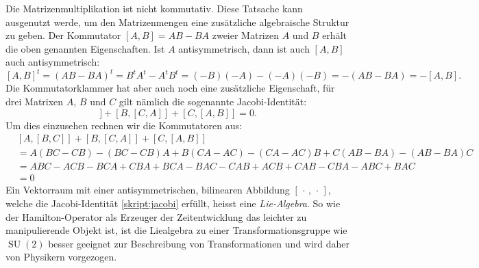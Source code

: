 Die Matrizenmultiplikation ist nicht kommutativ.
Diese Tatsache kann ausgenutzt werde, um den
Matrizenmengen eine zusätzliche algebraische Struktur zu geben.
%
Der Kommutator $[A,B]=AB-BA$ zweier Matrizen $A$ und $B$ erhält
die oben genannten Eigenschaften. Ist $A$ antisymmetrisch, dann
ist auch $[A,B]$ auch antisymmetrisch:
\[
[A,B]^t
=
(AB-BA)^t
=
B^tA^t-A^tB^t
=
(-B)(-A)-(-A)(-B)
=
-(AB-BA)
=
-[A,B].
\]
%
Die Kommutatorklammer hat aber auch noch eine zusätzliche Eigenschaft,
für drei Matrixen $A$, $B$ und $C$ gilt nämlich die sogenannte
Jacobi-Identität:
\begin{equation}
[A,[B, C]]
+
[B,[C, A]]
+
[C,[A, B]]
=
0.
\label{skript:jacobi}
\end{equation}
Um dies einzusehen rechnen wir die Kommutatoren aus:
\begin{align*}
&
[A,[B, C]]
+
[B,[C, A]]
+
[C,[A, B]]
\\
&=
A(BC-CB)-(BC-CB)A
+
B(CA-AC)-(CA-AC)B
+
C(AB-BA)-(AB-BA)C
\\
&=
ABC-ACB-BCA+CBA
+
BCA-BAC-CAB+ACB
+
CAB-CBA-ABC+BAC
\\
&=0
\end{align*}
Ein Vektorraum mit einer antisymmetrischen, bilinearen Abbildung
$[\,\cdot\,,\,\cdot\,]$,
welche die Jacobi-Identität \eqref{skript:jacobi} erfüllt, heisst eine
{\em Lie-Algebra}.
%
So wie der Hamilton-Operator als Erzeuger der Zeitentwicklung das
leichter zu manipulierende Objekt ist, ist die Liealgebra zu einer
Transformationsgruppe wie $\operatorname{SU}(2)$ besser geeignet
zur Beschreibung von Transformationen und wird daher von Physikern
vorgezogen.

